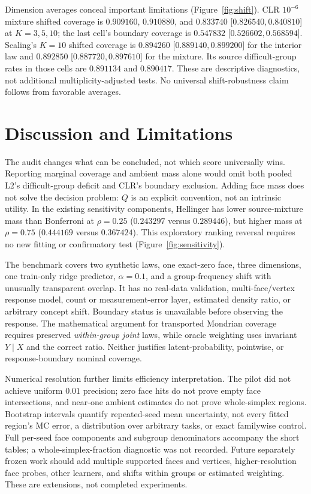 \documentclass{article}
\theoremstyle{plain}
\begin{document}
Dimension averages conceal important limitations (Figure~\ref{fig:shift}). CLR $10^{-6}$ mixture shifted coverage is $0.909160$, $0.910880$, and $0.833740$ [$0.826540,0.840810$] at $K=3,5,10$; the last cell's boundary coverage is $0.547832$ [$0.526602,0.568594$]. Scaling's $K=10$ shifted coverage is $0.894260$ [$0.889140,0.899200$] for the interior law and $0.892850$ [$0.887720,0.897610$] for the mixture. Its source difficult-group rates in those cells are $0.891134$ and $0.890417$. These are descriptive diagnostics, not additional multiplicity-adjusted tests. No universal shift-robustness claim follows from favorable averages.

\section{Discussion and Limitations}
\label{sec:limitations}
The audit changes what can be concluded, not which score universally wins. Reporting marginal coverage and ambient mass alone would omit both pooled L2's difficult-group deficit and CLR's boundary exclusion. Adding face mass does not solve the decision problem: $Q$ is an explicit convention, not an intrinsic utility. In the existing sensitivity components, Hellinger has lower source-mixture mass than Bonferroni at $\rho=0.25$ ($0.243297$ versus $0.289446$), but higher mass at $\rho=0.75$ ($0.444169$ versus $0.367424$). This exploratory ranking reversal requires no new fitting or confirmatory test (Figure~\ref{fig:sensitivity}).

The benchmark covers two synthetic laws, one exact-zero face, three dimensions, one train-only ridge predictor, $\alpha=0.1$, and a group-frequency shift with unusually transparent overlap. It has no real-data validation, multi-face/vertex response model, count or measurement-error layer, estimated density ratio, or arbitrary concept shift. Boundary status is unavailable before observing the response. The mathematical argument for transported Mondrian coverage requires preserved \emph{within-group joint} laws, while oracle weighting uses invariant $Y\mid X$ and the correct ratio. Neither justifies latent-probability, pointwise, or response-boundary nominal coverage.

Numerical resolution further limits efficiency interpretation. The pilot did not achieve uniform $0.01$ precision; zero face hits do not prove empty face intersections, and near-one ambient estimates do not prove whole-simplex regions. Bootstrap intervals quantify repeated-seed mean uncertainty, not every fitted region's MC error, a distribution over arbitrary tasks, or exact familywise control. Full per-seed face components and subgroup denominators accompany the short tables; a whole-simplex-fraction diagnostic was not recorded. Future separately frozen work should add multiple supported faces and vertices, higher-resolution face probes, other learners, and shifts within groups or estimated weighting. These are extensions, not completed experiments.
\end{document}
